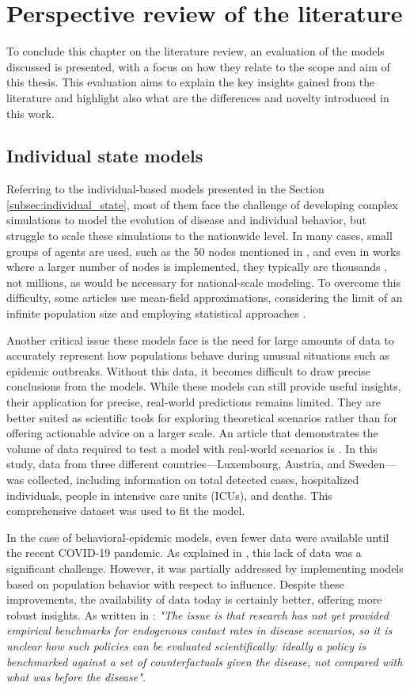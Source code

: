 \section{Perspective review of the literature}
To conclude this chapter on the literature review, an evaluation of the models discussed is presented, with a focus on how they relate to the scope and aim of this thesis. This evaluation aims to explain the key insights gained from the literature and highlight also what are the differences and novelty introduced in this work.

\subsection{Individual state models}
Referring to the individual-based models presented in the Section \ref{subsec:individual_state}, most of them face the challenge of developing complex simulations to model the evolution of disease and individual behavior, but struggle to scale these simulations to the nationwide level. In many cases, small groups of agents are used, such as the 50 nodes mentioned in \cite{Nunner2021}, and even in works where a larger number of nodes is implemented, they typically are thousands \cite{Granell2013}, not millions, as would be necessary for national-scale modeling. To overcome this difficulty, some articles use mean-field approximations, considering the limit of an infinite population size and employing statistical approaches \cite{Frieswijk_2022}.

Another critical issue these models face is the need for large amounts of data to accurately represent how populations behave during unusual situations such as epidemic outbreaks. Without this data, it becomes difficult to draw precise conclusions from the models. While these models can still provide useful insights, their application for precise, real-world predictions remains limited. They are better suited as scientific tools for exploring theoretical scenarios rather than for offering actionable advice on a larger scale. An article that demonstrates the volume of data required to test a model with real-world scenarios is \cite{Kemp_2021}. In this study, data from three different countries—Luxembourg, Austria, and Sweden—was collected, including information on total detected cases, hospitalized individuals, people in intensive care units (ICUs), and deaths. This comprehensive dataset was used to fit the model.

In the case of behavioral-epidemic models, even fewer data were available until the recent COVID-19 pandemic. As explained in \cite{Gosak2021}, this lack of data was a significant challenge. However, it was partially addressed by implementing models based on population behavior with respect to influence. Despite these improvements, the availability of data today is certainly better, offering more robust insights. As written in \cite{Gosak2021} : \textit{"The issue is that research has not yet provided empirical benchmarks for endogenous contact rates in disease scenarios, so it is unclear how such policies can be evaluated scientifically: ideally a policy is benchmarked against a set of counterfactuals given the disease, not compared with what was before the disease".}

